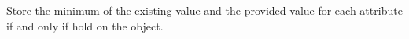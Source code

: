 Store the minimum of the existing value and the provided value for each
attribute if and only if  hold on the object.



